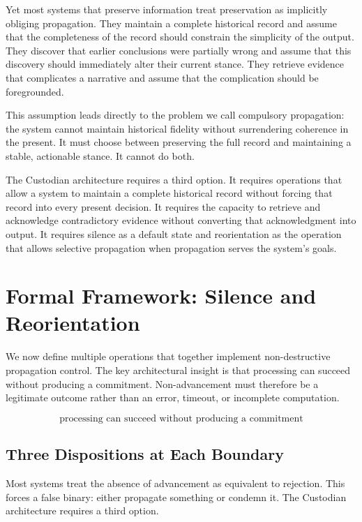 \documentclass[12pt]{article}
\begin{document}
Yet most systems that preserve information treat preservation as implicitly obliging propagation. They maintain a complete historical record and assume that the completeness of the record should constrain the simplicity of the output. They discover that earlier conclusions were partially wrong and assume that this discovery should immediately alter their current stance. They retrieve evidence that complicates a narrative and assume that the complication should be foregrounded.

This assumption leads directly to the problem we call compulsory propagation: the system cannot maintain historical fidelity without surrendering coherence in the present. It must choose between preserving the full record and maintaining a stable, actionable stance. It cannot do both.

The Custodian architecture requires a third option. It requires operations that allow a system to maintain a complete historical record without forcing that record into every present decision. It requires the capacity to retrieve and acknowledge contradictory evidence without converting that acknowledgment into output. It requires silence as a default state and reorientation as the operation that allows selective propagation when propagation serves the system's goals.

\section{Formal Framework: Silence and Reorientation}

We now define multiple operations that together implement non-destructive propagation control. The key architectural insight is that processing can succeed without producing a commitment. Non-advancement must therefore be a legitimate outcome rather than an error, timeout, or incomplete computation.

\begin{equation}
\boxed{\text{processing can succeed without producing a commitment}}
\end{equation}

\subsection{Three Dispositions at Each Boundary}

Most systems treat the absence of advancement as equivalent to rejection. This forces a false binary: either propagate something or condemn it. The Custodian architecture requires a third option.
\end{document}
